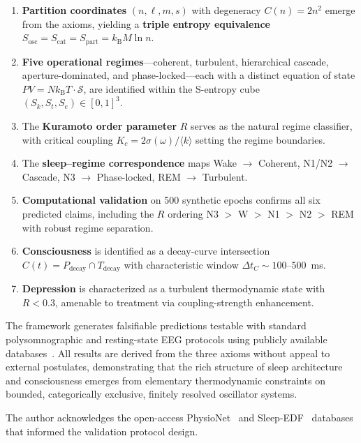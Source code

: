 \documentclass[aps,prd,twocolumn,superscriptaddress,floatfix,nofootinbib]{revtex4-2}
\theoremstyle{remark}
\newcommand{\kB}{k_{\mathrm{B}}}
\newcommand{\Sk}{S_k}
\newcommand{\St}{S_t}
\newcommand{\Se}{S_e}
\newcommand{\Sosc}{S_{\mathrm{osc}}}
\newcommand{\Scat}{S_{\mathrm{cat}}}
\newcommand{\Spart}{S_{\mathrm{part}}}
\newcommand{\Pdecay}{P_{\mathrm{decay}}}
\newcommand{\Tdecay}{T_{\mathrm{decay}}}
\newcommand{\Rorder}{R}
\newcommand{\Kc}{K_c}
\newcommand{\Sregime}{\mathcal{S}}
\begin{document}
\begin{enumerate}
    \item \textbf{Partition coordinates} $(n, \ell, m, s)$ with degeneracy $C(n) = 2n^2$ emerge from the axioms, yielding a \textbf{triple entropy equivalence} $\Sosc = \Scat = \Spart = \kB M \ln n$.

    \item \textbf{Five operational regimes}---coherent, turbulent, hierarchical cascade, aperture-dominated, and phase-locked---each with a distinct equation of state $PV = N\kB T \cdot \Sregime$, are identified within the S-entropy cube $(\Sk, \St, \Se) \in [0,1]^3$.

    \item The \textbf{Kuramoto order parameter} $\Rorder$ serves as the natural regime classifier, with critical coupling $\Kc = 2\sigma(\omega)/\langle k \rangle$ setting the regime boundaries.

    \item The \textbf{sleep--regime correspondence} maps Wake $\to$ Coherent, N1/N2 $\to$ Cascade, N3 $\to$ Phase-locked, REM $\to$ Turbulent.

    \item \textbf{Computational validation} on 500 synthetic epochs confirms all six predicted claims, including the $\Rorder$ ordering N3 $>$ W $>$ N1 $>$ N2 $>$ REM with robust regime separation.

    \item \textbf{Consciousness} is identified as a decay-curve intersection $C(t) = \Pdecay \cap \Tdecay$ with characteristic window $\Delta t_C \sim 100$--$500$~ms.

    \item \textbf{Depression} is characterized as a turbulent thermodynamic state with $\Rorder < 0.3$, amenable to treatment via coupling-strength enhancement.
\end{enumerate}

The framework generates falsifiable predictions testable with standard polysomnographic and resting-state EEG protocols using publicly available databases~\cite{kemp2000analysis,goldberger2000physiobank,markiewicz2021openneuro}. All results are derived from the three axioms without appeal to external postulates, demonstrating that the rich structure of sleep architecture and consciousness emerges from elementary thermodynamic constraints on bounded, categorically exclusive, finitely resolved oscillator systems.

\begin{acknowledgments}
The author acknowledges the open-access PhysioNet~\cite{goldberger2000physiobank} and Sleep-EDF~\cite{kemp2000analysis} databases that informed the validation protocol design.
\end{acknowledgments}



\end{document}
